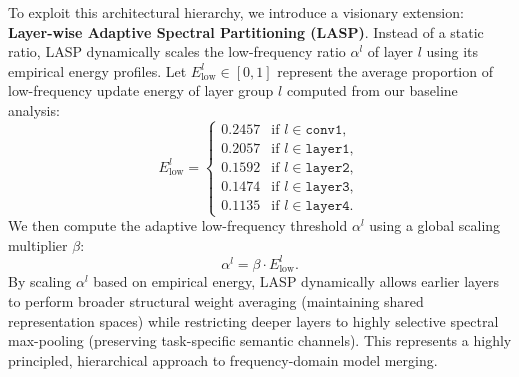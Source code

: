 \documentclass{article}
\theoremstyle{plain}
\theoremstyle{definition}
\theoremstyle{remark}
\begin{document}
To exploit this architectural hierarchy, we introduce a visionary extension: \textbf{Layer-wise Adaptive Spectral Partitioning (LASP)}. Instead of a static ratio, LASP dynamically scales the low-frequency ratio $\alpha^l$ of layer $l$ using its empirical energy profiles. Let $E^l_{\text{low}} \in [0, 1]$ represent the average proportion of low-frequency update energy of layer group $l$ computed from our baseline analysis:
\begin{equation}
    E^l_{\text{low}} = 
    \begin{cases}
        0.2457 & \text{if } l \in \texttt{conv1}, \\
        0.2057 & \text{if } l \in \texttt{layer1}, \\
        0.1592 & \text{if } l \in \texttt{layer2}, \\
        0.1474 & \text{if } l \in \texttt{layer3}, \\
        0.1135 & \text{if } l \in \texttt{layer4}.
    \end{cases}
\end{equation}
We then compute the adaptive low-frequency threshold $\alpha^l$ using a global scaling multiplier $\beta$:
\begin{equation}
    \alpha^l = \beta \cdot E^l_{\text{low}}.
\end{equation}
By scaling $\alpha^l$ based on empirical energy, LASP dynamically allows earlier layers to perform broader structural weight averaging (maintaining shared representation spaces) while restricting deeper layers to highly selective spectral max-pooling (preserving task-specific semantic channels). This represents a highly principled, hierarchical approach to frequency-domain model merging.
\end{document}
